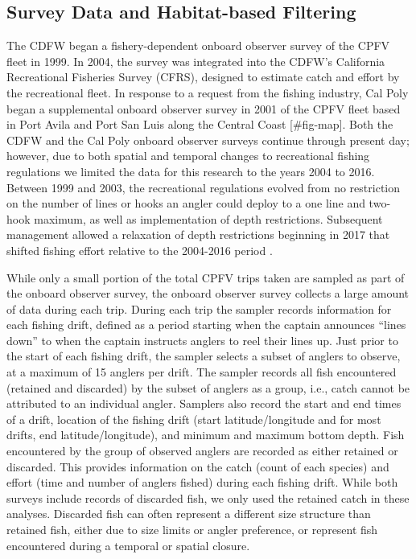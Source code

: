 \documentclass[
  12pt,
  authoryear,
  preprint,
  3p]{elsarticle}
\begin{document}
\hypertarget{survey-data-and-habitat-based-filtering}{%
\subsection{Survey Data and Habitat-based
Filtering}\label{survey-data-and-habitat-based-filtering}}

The CDFW began a fishery-dependent onboard observer survey of the CPFV
fleet in 1999. In 2004, the survey was integrated into the CDFW's
California Recreational Fisheries Survey (CFRS), designed to estimate
catch and effort by the recreational fleet. In response to a request
from the fishing industry, Cal Poly began a supplemental onboard
observer survey in 2001 of the CPFV fleet based in Port Avila and Port
San Luis along the Central Coast {[}\#fig-map{]}. Both the CDFW and the
Cal Poly onboard observer surveys continue through present day; however,
due to both spatial and temporal changes to recreational fishing
regulations we limited the data for this research to the years 2004 to
2016. Between 1999 and 2003, the recreational regulations evolved from
no restriction on the number of lines or hooks an angler could deploy to
a one line and two-hook maximum, as well as implementation of depth
restrictions. Subsequent management allowed a relaxation of depth
restrictions beginning in 2017 that shifted fishing effort relative to
the 2004-2016 period \citep{Monk:2021:SVR}.

While only a small portion of the total CPFV trips taken are sampled as
part of the onboard observer survey, the onboard observer survey
collects a large amount of data during each trip. During each trip the
sampler records information for each fishing drift, defined as a period
starting when the captain announces ``lines down'' to when the captain
instructs anglers to reel their lines up. Just prior to the start of
each fishing drift, the sampler selects a subset of anglers to observe,
at a maximum of 15 anglers per drift. The sampler records all fish
encountered (retained and discarded) by the subset of anglers as a
group, i.e., catch cannot be attributed to an individual angler.
Samplers also record the start and end times of a drift, location of the
fishing drift (start latitude/longitude and for most drifts, end
latitude/longitude), and minimum and maximum bottom depth. Fish
encountered by the group of observed anglers are recorded as either
retained or discarded. This provides information on the catch (count of
each species) and effort (time and number of anglers fished) during each
fishing drift. While both surveys include records of discarded fish, we
only used the retained catch in these analyses. Discarded fish can often
represent a different size structure than retained fish, either due to
size limits or angler preference, or represent fish encountered during a
temporal or spatial closure.
\end{document}
